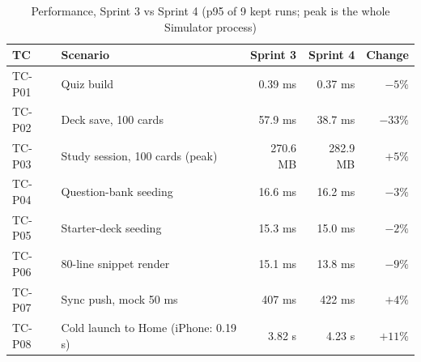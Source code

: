 \documentclass[12pt,letterpaper]{article}
\begin{document}
\begin{table}[H]
\centering
\caption{Performance, Sprint 3 vs Sprint 4 (p95 of 9 kept runs; peak is the whole Simulator process)}
\label{tab:perfcompare}
\begin{tabular}{@{}l l r r r@{}}
\toprule
\textbf{TC} & \textbf{Scenario} & \textbf{Sprint 3} & \textbf{Sprint 4} & \textbf{Change} \\
\midrule
TC-P01 & Quiz build & 0.39 ms & 0.37 ms & $-5\%$ \\
TC-P02 & Deck save, 100 cards & 57.9 ms & 38.7 ms & $-33\%$ \\
TC-P03 & Study session, 100 cards (peak) & 270.6 MB & 282.9 MB & $+5\%$ \\
TC-P04 & Question-bank seeding & 16.6 ms & 16.2 ms & $-3\%$ \\
TC-P05 & Starter-deck seeding & 15.3 ms & 15.0 ms & $-2\%$ \\
TC-P06 & 80-line snippet render & 15.1 ms & 13.8 ms & $-9\%$ \\
TC-P07 & Sync push, mock 50 ms & 407 ms & 422 ms & $+4\%$ \\
TC-P08 & Cold launch to Home (iPhone: 0.19 s) & 3.82 s & 4.23 s & $+11\%$ \\
\bottomrule
\end{tabular}
\end{table}
\end{document}
